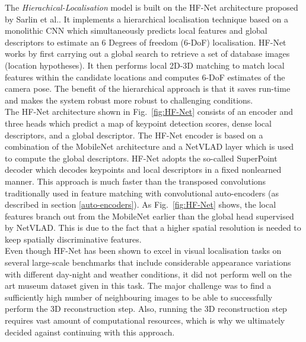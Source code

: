 \documentclass[conference]{IEEEtran}
\begin{document}
The \textit{Hierachical-Localisation} model is built on the HF-Net architecture \cite{b9} proposed by Sarlin et al.. It implements a  hierarchical localisation technique based on a monolithic CNN which simultaneously predicts local features and
global descriptors to estimate an 6 Degrees of freedom (6-DoF) localisation. HF-Net works by first carrying out a global search to retrieve a set of database images (location hypotheses). It then performs local 2D-3D matching to match local features within the candidate locations and computes 6-DoF estimates of the camera pose. The benefit of the hierarchical approach is that it saves run-time and makes the system robust more robust to challenging conditions.\\
The HF-Net architecture shown in Fig.~\ref{fig:HF-Net} consists of an encoder and three heads which predict a map of keypoint detection scores, dense local descriptors, and a global descriptor. 
The HF-Net encoder is based on a combination of the MobileNet \cite{b10} architecture  and a NetVLAD layer \cite{b11} which is used to compute the global descriptors. HF-Net adopts the so-called SuperPoint \cite{b3} decoder which decodes keypoints and local descriptors in a fixed nonlearned manner.
This approach is much faster than the transposed convolutions traditionally used in feature matching with convolutional auto-encoders (as described in section \ref{auto-encoders}). 
As Fig.~\ref{fig:HF-Net} shows, the local features branch out from the MobileNet earlier than the global head supervised by NetVLAD. This is due to the fact that a higher spatial resolution is needed to keep spatially discriminative
features.\\
Even though HF-Net has been shown to excel in visual localisation tasks on several large-scale benchmarks that include considerable appearance variations with different day-night and weather conditions, it did not perform well on the art museum dataset given in this task. The major challenge was to find a sufficiently high number of neighbouring images to be able to successfully perform the 3D reconstruction step. Also, running the 3D reconstruction step requires vast amount of computational resources, which is why we ultimately decided against continuing with this approach.
\end{document}
